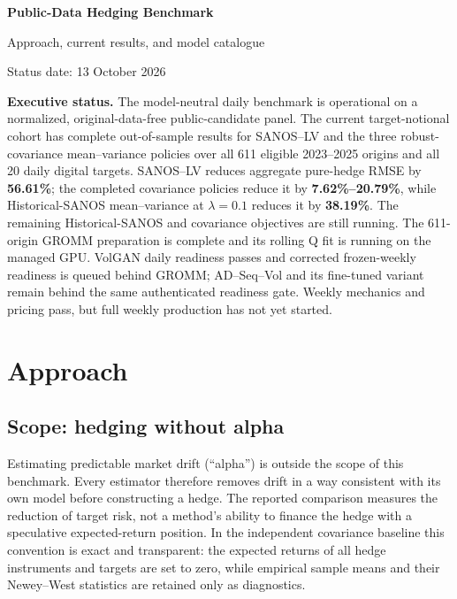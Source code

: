\documentclass[10pt]{article}
\begin{document}
\begin{center}
  {\LARGE\bfseries\color{navy} Public-Data Hedging Benchmark}\par
  \vspace{0.2em}
  {\large Approach, current results, and model catalogue}\par
  \vspace{0.35em}
  {\color{grey}Status date: 13 October 2026}
\end{center}

\vspace{0.4em}
\noindent\colorbox{pale}{%
  \parbox{\dimexpr\textwidth-2\fboxsep\relax}{%
  \textbf{Executive status.}
  The model-neutral daily benchmark is operational on a normalized,
  original-data-free public-candidate panel. The current target-notional cohort
  has complete out-of-sample results for SANOS--LV and the three
  robust-covariance mean--variance policies over all 611 eligible 2023--2025
  origins and all 20 daily digital targets. SANOS--LV reduces aggregate
  pure-hedge RMSE by \textbf{56.61\%}; the completed covariance policies reduce
  it by \textbf{7.62\%--20.79\%}, while Historical-SANOS mean--variance at
  $\lambda=0.1$ reduces it by \textbf{38.19\%}. The remaining Historical-SANOS
  and covariance objectives are still running. The 611-origin GROMM preparation is complete
  and its rolling Q fit is running on the managed GPU. VolGAN daily readiness
  passes and corrected frozen-weekly readiness is queued behind GROMM; AD--Seq--Vol and its
  fine-tuned variant remain behind the same authenticated readiness gate.
  Weekly mechanics and pricing pass, but full weekly production has not yet
  started.}}

\section{Approach}

\subsection{Scope: hedging without alpha}

Estimating predictable market drift (``alpha'') is outside the scope of this
benchmark. Every estimator therefore removes drift in a way consistent with
its own model before constructing a hedge. The reported comparison measures
the reduction of target risk, not a method's ability to finance the hedge with
a speculative expected-return position. In the independent covariance
baseline this convention is exact and transparent: the expected returns of
all hedge instruments and targets are set to zero, while empirical sample
means and their Newey--West statistics are retained only as diagnostics.
\end{document}
